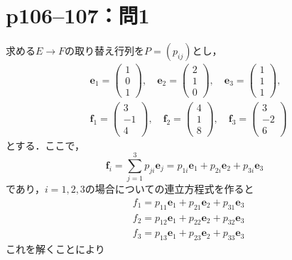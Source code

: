 \section*{p106--107：問1}
\begin{tanswer}
  求める$E\to F$の取り替え行列を$P=(p_{ij})$とし，
  \begin{align*}
     & \bm{e}_1=
    \begin{pmatrix}
      1 \\
      0 \\
      1
    \end{pmatrix}
    ,\quad
    \bm{e}_2=
    \begin{pmatrix}
      2 \\
      1 \\
      0
    \end{pmatrix}
    ,\quad
    \bm{e}_3=
    \begin{pmatrix}
      1 \\
      1 \\
      1
    \end{pmatrix}
    ,            \\
     &
    \bm{f}_1=
    \begin{pmatrix}
      3  \\
      -1 \\
      4
    \end{pmatrix}
    ,\quad
    \bm{f}_2=
    \begin{pmatrix}
      4 \\
      1 \\
      8
    \end{pmatrix}
    ,\quad
    \bm{f}_3=
    \begin{pmatrix}
      3  \\
      -2 \\
      6
    \end{pmatrix}
  \end{align*}
  とする．ここで，
  \[
    \bm{f}_i=\sum^{3}_{j=1}p_{ji}\bm{e}_{j}=p_{1i}\bm{e}_1+p_{2i}\bm{e}_2+p_{3i}\bm{e}_3
  \]
  であり，$i=1,2,3$の場合についての連立方程式を作ると
  \begin{align*}
     & f_1=p_{11}\bm{e}_1+p_{21}\bm{e}_2+p_{31}\bm{e}_3 \\
     & f_2=p_{12}\bm{e}_1+p_{22}\bm{e}_2+p_{32}\bm{e}_3 \\
     & f_3=p_{13}\bm{e}_1+p_{23}\bm{e}_2+p_{33}\bm{e}_3
  \end{align*}
  これを解くことにより

\end{tanswer}
